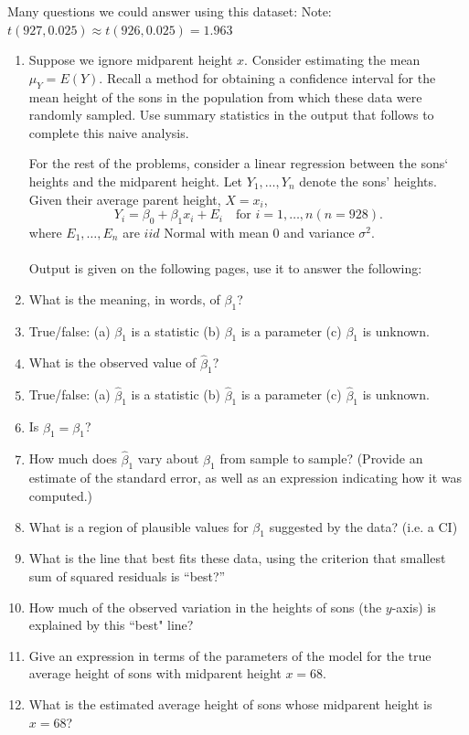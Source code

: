 Many questions we could answer using this dataset: Note: $t(927,0.025)\approx t(926,0.025)=1.963$
\begin{enumerate}
\item Suppose we ignore midparent height $x$.  Consider estimating the mean $\mu_{Y}=E(Y)$.  Recall a method for obtaining a confidence interval for the mean height of the sons in the population from which these data were randomly sampled.  Use summary statistics in the output that follows to complete this naive analysis. 

\newpage

For the rest of the problems, consider a linear regression between the sons` heights and the midparent height.  Let $Y_1,\ldots,Y_n$ denote the sons' heights.  Given their average parent height, $X=x_i$,
$$ Y_i = \beta_0 + \beta_1 x_i + E_i \ \ \ \mbox{ for }i=1,\ldots,n (n=928).$$
where $E_1,\ldots,E_n$ are $iid$ Normal with mean 0 and variance $\sigma^2$.\\~\\
Output is given on the following pages, use it to answer the following:\\
\item What is the meaning, in words, of $\beta_1$?
\item True/false: (a) $\beta_1$ is a statistic (b) $\beta_1$ is a parameter (c) $\beta_1$ is unknown.
\item What is the observed value of $\hat\beta_1$?
\item True/false: (a) $\hat\beta_1$ is a statistic (b) $\hat\beta_1$ is a parameter (c) $\hat\beta_1$ is unknown.
\item Is $\hat\beta_1=\beta_1$?
\item How much does $\hat\beta_1$ vary about $\beta_1$ from sample to sample?  (Provide an estimate of the standard error, as well as an expression indicating how it was computed.)
\item What is a region of plausible values for $\beta_1$ suggested by the data? (i.e. a CI)
\item What is the line that best fits these data, using the criterion that smallest sum of squared residuals is ``best?''
\item How much of the observed variation in the heights of sons (the $y$-axis) is explained by this ``best" line?
\item Give an expression in terms of the parameters of the model for the true average height of sons with midparent height $x=68$.
\item What is the estimated average height of sons whose midparent height is $x=68$?

\end{enumerate}
